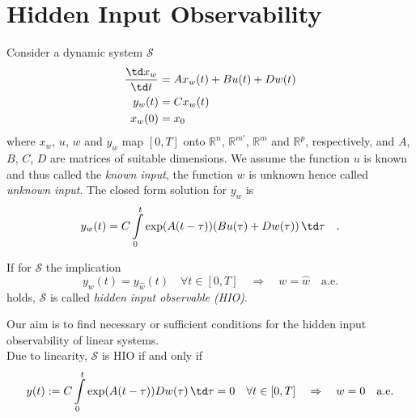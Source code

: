 \section*{Hidden Input Observability}
Consider a dynamic system $\mathcal{S}$
\begin{align}
\frac{\td x_w}{\td t} &= Ax_w(t) + Bu(t) + Dw(t) \\
y_w(t) &= Cx_w(t) \\
x_w(0) &= x_0
\end{align}
where $x_w$, $u$, $w$ and $y_w$ map $[0,T]$ onto $\mathbb{R}^n$, 
$\mathbb{R}^{m'}$, $\mathbb{R}^m$ and $\mathbb{R}^p$, respectively, and 
$A$, $B$, $C$, $D$ are matrices of suitable dimensions. We assume the function $u$ is known 
and thus called the \textit{known input}, the function $w$ is unknown hence called 
\textit{unknown input}. The closed form solution for $y_w$ is
\begin{equation}
y_w(t) = C \int\limits_0^t \exp(A(t-\tau)) (Bu(\tau) + Dw(\tau) ) \, \td 
\tau \quad .
\end{equation}

\begin{definition}
If for $\mathcal{S}$ the implication
\begin{equation}
y_{w}(t) = y_{\hat{w}}(t) \quad \forall t\in [0,T]
\quad \Rightarrow \quad 
 w = \hat{w} \quad \text{a.e.}
\end{equation}
holds, $\mathcal{S}$ is called \textit{hidden input observable (HIO)}.
\end{definition}

Our aim is to find necessary or sufficient conditions for the hidden input observability 
of linear systems.\\

Due to linearity, $\mathcal{S}$ is HIO if and only if
\begin{equation}
y(t):=C\int\limits_0^t \exp(A(t-\tau))Dw(\tau)\,\td\tau = 0 \quad 
\forall t\in[0,T] \quad \Rightarrow \quad 
w = 0 \quad \text{a.e.} \label{eq:introduction_alt:1}
\end{equation}

